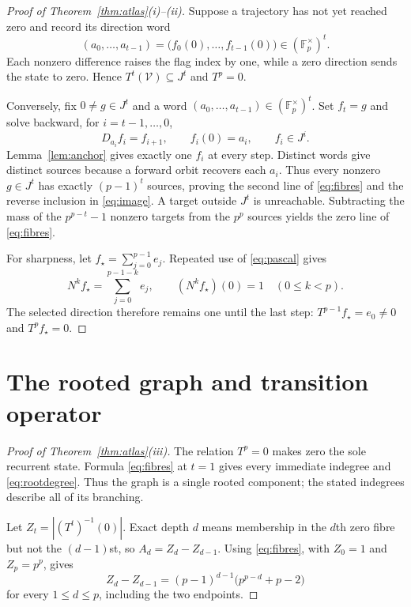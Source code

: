 \documentclass[a4paper,10pt]{amsart}
\theoremstyle{remark}
\newcommand{\F}{\mathbb F}
\newcommand{\cV}{\mathcal V}
\begin{document}
\begin{proof}[Proof of Theorem~\ref{thm:atlas}(i)--(ii)]
Suppose a trajectory has not yet reached zero and record its direction word
\[
          (a_0,\ldots,a_{t-1})
          =\bigl(f_0(0),\ldots,f_{t-1}(0)\bigr)
          \in(\F_p^\times)^t.
\]
Each nonzero difference raises the flag index by one, while a zero direction
sends the state to zero.  Hence $T^t(\cV)\subseteq J^t$ and $T^p=0$.

Conversely, fix $0\ne g\in J^t$ and a word
$(a_0,\ldots,a_{t-1})\in(\F_p^\times)^t$.  Set $f_t=g$ and solve backward,
for $i=t-1,\ldots,0$,
\begin{equation}\label{eq:backward}
             D_{a_i}f_i=f_{i+1},\qquad f_i(0)=a_i,
             \qquad f_i\in J^i.
\end{equation}
Lemma~\ref{lem:anchor} gives exactly one $f_i$ at every step.  Distinct
words give distinct sources because a forward orbit recovers each $a_i$.
Thus every nonzero $g\in J^t$ has exactly $(p-1)^t$ sources, proving the
second line of \eqref{eq:fibres} and the reverse inclusion in
\eqref{eq:image}.  A target outside $J^t$ is unreachable.  Subtracting the
mass of the $p^{p-t}-1$ nonzero targets from the $p^p$ sources yields the
zero line of \eqref{eq:fibres}.

For sharpness, let $f_\star=\sum_{j=0}^{p-1}e_j$.  Repeated use of
\eqref{eq:pascal} gives
\[
        N^k f_\star=\sum_{j=0}^{p-1-k}e_j,\qquad
        (N^k f_\star)(0)=1\quad(0\le k<p).
\]
The selected direction therefore remains one until the last step:
$T^{p-1}f_\star=e_0\ne0$ and $T^pf_\star=0$.
\end{proof}

\section{The rooted graph and transition operator}

\begin{proof}[Proof of Theorem~\ref{thm:atlas}(iii)]
The relation $T^p=0$ makes zero the sole recurrent state.  Formula
\eqref{eq:fibres} at $t=1$ gives every immediate indegree and
\eqref{eq:rootdegree}.  Thus the graph is a single rooted component; the
stated indegrees describe all of its branching.

Let $Z_t=|(T^t)^{-1}(0)|$.  Exact depth $d$ means membership in the
$d$th zero fibre but not the $(d-1)$st, so $A_d=Z_d-Z_{d-1}$.  Using
\eqref{eq:fibres}, with $Z_0=1$ and $Z_p=p^p$, gives
\[
 Z_d-Z_{d-1}
 =(p-1)^{d-1}\bigl(p^{p-d}+p-2\bigr)
\]
for every $1\le d\le p$, including the two endpoints.
\end{proof}
\end{document}
